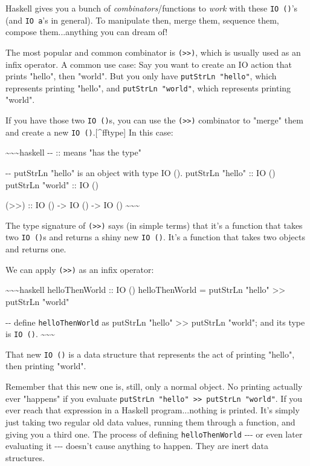\documentclass[]{article}
\begin{document}
Haskell gives you a bunch of \emph{combinators}/functions to \emph{work} with
these \texttt{IO\ ()}'s (and \texttt{IO\ a}'s in general). To manipulate then,
merge them, sequence them, compose them...anything you can dream of!

The most popular and common combinator is
\texttt{(\textgreater{}\textgreater{})}, which is usually used as an infix
operator. A common use case: Say you want to create an IO action that prints
"hello", then "world". But you only have \texttt{putStrLn\ "hello"}, which
represents printing "hello", and \texttt{putStrLn\ "world"}, which represents
printing "world".

If you have those two \texttt{IO\ ()}s, you can use the
\texttt{(\textgreater{}\textgreater{})} combinator to "merge" them and create a
new \texttt{IO\ ()}.{[}\^{}fftype{]} In this case:

\textasciitilde{}\textasciitilde{}\textasciitilde{}haskell -\/- :: means "has
the type"

-\/- putStrLn "hello" is an object with type IO (). putStrLn "hello" :: IO ()
putStrLn "world" :: IO ()

(\textgreater{}\textgreater{}) :: IO () -\textgreater{} IO () -\textgreater{} IO
() \textasciitilde{}\textasciitilde{}\textasciitilde{}

The type signature of \texttt{(\textgreater{}\textgreater{})} says (in simple
terms) that it's a function that takes two \texttt{IO\ ()}s and returns a shiny
new \texttt{IO\ ()}. It's a function that takes two objects and returns one.

We can apply \texttt{(\textgreater{}\textgreater{})} as an infix operator:

\textasciitilde{}\textasciitilde{}\textasciitilde{}haskell helloThenWorld :: IO
() helloThenWorld = putStrLn "hello" \textgreater{}\textgreater{} putStrLn
"world"

-\/- define \texttt{helloThenWorld} as putStrLn "hello"
\textgreater{}\textgreater{} putStrLn "world"; and its type is \texttt{IO\ ()}.
\textasciitilde{}\textasciitilde{}\textasciitilde{}

That new \texttt{IO\ ()} is a data structure that represents the act of printing
"hello", then printing "world".

Remember that this new one is, still, only a normal object. No printing actually
ever "happens" if you evaluate
\texttt{putStrLn\ "hello"\ \textgreater{}\textgreater{}\ putStrLn\ "world"}. If
you ever reach that expression in a Haskell program...nothing is printed. It's
simply just taking two regular old data values, running them through a function,
and giving you a third one. The process of defining \texttt{helloThenWorld}
-\/-\/- or even later evaluating it -\/-\/- doesn't cause anything to happen.
They are inert data structures.
\end{document}
